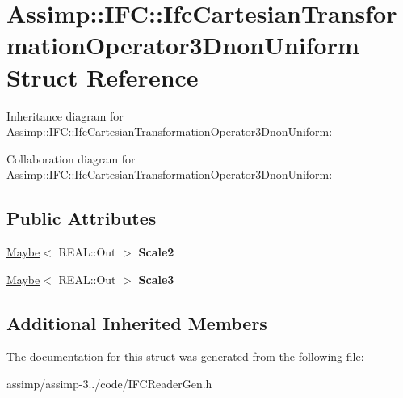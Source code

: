 \hypertarget{struct_assimp_1_1_i_f_c_1_1_ifc_cartesian_transformation_operator3_dnon_uniform}{\section{Assimp\+:\+:I\+F\+C\+:\+:Ifc\+Cartesian\+Transformation\+Operator3\+Dnon\+Uniform Struct Reference}
\label{struct_assimp_1_1_i_f_c_1_1_ifc_cartesian_transformation_operator3_dnon_uniform}
}


Inheritance diagram for Assimp\+:\+:I\+F\+C\+:\+:Ifc\+Cartesian\+Transformation\+Operator3\+Dnon\+Uniform\+:


Collaboration diagram for Assimp\+:\+:I\+F\+C\+:\+:Ifc\+Cartesian\+Transformation\+Operator3\+Dnon\+Uniform\+:
\subsection*{Public Attributes}
\begin{DoxyCompactItemize}
\item 
\hypertarget{struct_assimp_1_1_i_f_c_1_1_ifc_cartesian_transformation_operator3_dnon_uniform_ab5b782a3ca38470b5b4b0680bf504df0}{\hyperlink{struct_assimp_1_1_s_t_e_p_1_1_maybe}{Maybe}$<$ R\+E\+A\+L\+::\+Out $>$ {\bfseries Scale2}}\label{struct_assimp_1_1_i_f_c_1_1_ifc_cartesian_transformation_operator3_dnon_uniform_ab5b782a3ca38470b5b4b0680bf504df0}

\item 
\hypertarget{struct_assimp_1_1_i_f_c_1_1_ifc_cartesian_transformation_operator3_dnon_uniform_aa8fae7143d6b6a71df878077eb819996}{\hyperlink{struct_assimp_1_1_s_t_e_p_1_1_maybe}{Maybe}$<$ R\+E\+A\+L\+::\+Out $>$ {\bfseries Scale3}}\label{struct_assimp_1_1_i_f_c_1_1_ifc_cartesian_transformation_operator3_dnon_uniform_aa8fae7143d6b6a71df878077eb819996}

\end{DoxyCompactItemize}
\subsection*{Additional Inherited Members}


The documentation for this struct was generated from the following file\+:\begin{DoxyCompactItemize}
\item 
assimp/assimp-\/3../code/I\+F\+C\+Reader\+Gen.\+h\end{DoxyCompactItemize}
